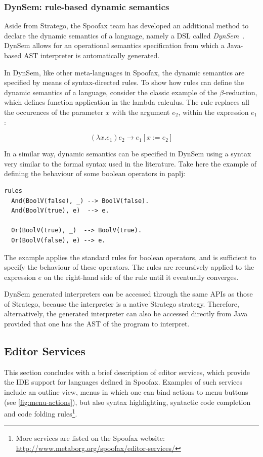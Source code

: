 \subsubsection{DynSem: rule-based dynamic semantics}
\label{ssec:dynsem}
Aside from Stratego, the Spoofax team has developed an additional
method to declare the dynamic semantics of a language, namely a DSL
called \emph{DynSem}~\cite{VerguNV15}. DynSem allows for an operational
semantics specification from which a Java-based AST interpreter is
automatically generated.

In DynSem, like other meta-languages in Spoofax, the dynamic semantics
are specified by means of syntax-directed rules. To show how rules can
define the dynamic semantics of a language, consider the classic
example of the \(\beta\)-reduction, which defines function application in
the lambda calculus. The rule replaces all the occurences of the
parameter \(x\) with the argument \(e_2\), within the expression \(e_1\):

\begin{equation}
(\lambda x.e_1) e_2 \rightarrow e_1[x := e_2]
\end{equation}

In a similar way, dynamic semantics can be specified in DynSem using a
syntax very similar to the formal syntax used in the literature. Take
here the example of defining the behaviour of some boolean operators
in paplj:
\lstset{language=dynsem,numbers=left}
\begin{lstlisting}
rules
  And(BoolV(false), _) --> BoolV(false).
  And(BoolV(true), e)  --> e.

  Or(BoolV(true), _)  --> BoolV(true).
  Or(BoolV(false), e) --> e.
\end{lstlisting}
The example applies the standard rules for boolean operators, and is
sufficient to specify the behaviour of these operators. The rules are
recursively applied to the expression \(e\) on the right-hand side of
the rule until it eventually converges.

DynSem generated interpreters can be accessed through the same APIs as
those of Stratego, because the interpreter is a native Stratego
strategy. Therefore, alternatively, the generated interpreter can also
be accessed directly from Java provided that one has the AST of the
program to interpret.

\lstset{numbers=none}

\subsection{Editor Services}
\label{ssec:editor-serv}
This section concludes with a brief description of editor services,
which provide the IDE support for languages defined in
Spoofax. Examples of such services include an outline view, menus in
which one can bind actions to menu buttons (see
\cref{fig:menu-actions}), but also syntax highlighting, syntactic code
completion and code folding rules\footnote{More services are
listed on the Spoofax website:
\url{http://www.metaborg.org/spoofax/editor-services/}}.

